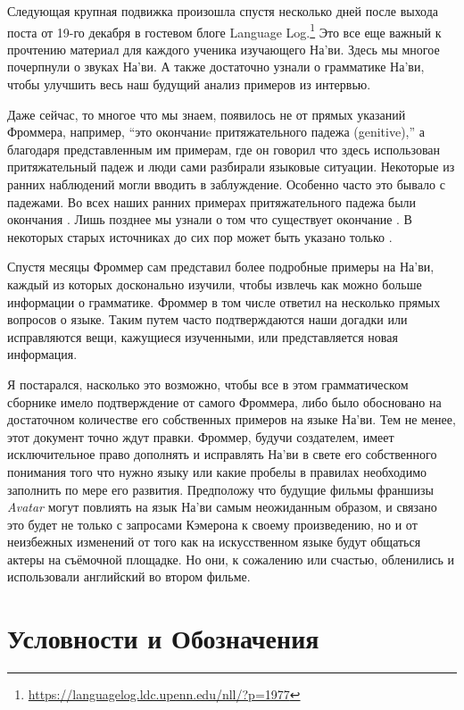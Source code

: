 Следующая крупная подвижка произошла спустя несколько дней после выхода поста от 19-го декабря в гостевом блоге Language Log.\footnote{\url{https://languagelog.ldc.upenn.edu/nll/?p=1977}}
Это все еще важный к прочтению материал для каждого ученика изучающего На'ви. Здесь мы многое почерпнули о звуках На'ви. А также 
достаточно узнали о грамматике На’ви, чтобы улучшить весь наш будущий анализ
примеров из интервью.

Даже сейчас, то многое что мы знаем, появилось не от прямых указаний Фроммера, например, ``это окончаниe притяжательного падежа (genitive),'' а благодаря представленным им примерам, где он говорил что здесь использован притяжательный падеж и люди сами разбирали языковые ситуации.  Некоторые из ранних наблюдений могли вводить в заблуждение. Особенно часто это бывало с падежами.  Во всех наших ранних примерах притяжательного падежа были окончания . Лишь позднее мы узнали о том что существует окончание .  В некоторых старых источниках до сих пор может быть указано только 
.

Спустя месяцы Фроммер сам представил более подробные примеры на На'ви, каждый из которых досконально изучили, чтобы извлечь как можно больше информации о грамматике.  Фроммер в том числе ответил на несколько прямых вопросов о языке.  Таким путем часто 
подтверждаются наши догадки или исправляются вещи, кажущиеся изученными, или представляется новая информация.

Я постарался, насколько это возможно, чтобы все в этом
грамматическом сборнике имело подтверждение от самого Фроммера, либо было обосновано на достаточном количестве его собственных примеров на языке На'ви.  Тем не менее, этот документ точно ждут правки. Фроммер, будучи создателем, имеет исключительное право дополнять и исправлять На'ви в свете его собственного понимания того что нужно языку или какие пробелы в правилах необходимо заполнить по мере его развития.
Предположу что будущие фильмы франшизы \textit{Avatar} могут повлиять на язык На'ви самым неожиданным образом, и связано это будет не только с запросами Кэмерона к своему произведению, но и от неизбежных изменений от того как на искусственном языке будут общаться  актеры на съёмочной площадке. Но они, к сожалению или счастью, обленились и использовали английский во втором фильме.


\section{Условности и Обозначения}

